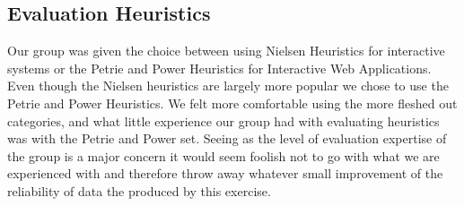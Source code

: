 \subsection{Evaluation Heuristics}
Our group was given the choice between using Nielsen Heuristics for interactive systems or the Petrie and Power Heuristics for Interactive Web Applications. Even though the Nielsen heuristics are largely more popular we chose to use the Petrie and Power Heuristics. We felt more comfortable using the more fleshed out categories, and what little experience our group had with evaluating heuristics was with the Petrie and Power set. Seeing as the level of evaluation expertise of the group is a major concern it would seem foolish not to go with what we are experienced with and therefore throw away whatever small improvement of the reliability of data the produced by this exercise.

